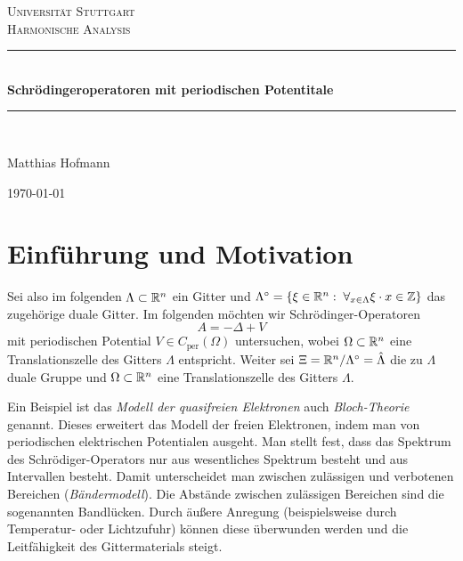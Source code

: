 \documentclass{mywork}
\begin{document}
\begin{titlepage}

\begin{center}



\textsc{\LARGE Universität Stuttgart}\\[1.5cm]

\textsc{\Large Harmonische Analysis}\\[0.5cm]


\newcommand{\HRule}{\rule{\linewidth}{0.5mm}}
\HRule \\[0.4cm]
{ \huge \bfseries Schrödingeroperatoren mit periodischen Potentitale}\\[0.4cm]

\HRule \\[1.5cm]


\begin{center} \Large
Matthias Hofmann
\end{center}

\hfill

\vfill

{\large \today}

\end{center}

\end{titlepage}
\section{Einführung und Motivation}
Sei also im folgenden $\Lambda \subset \mathbb{R}^n$ ein Gitter und $\Lambda^\circ= \{\xi \in \R^n: \forall_{x\in \Lambda} \xi \cdot x \in \Z\}$ das zugehörige duale Gitter. Im folgenden möchten wir Schrödinger-Operatoren 
$$ A=- \Delta + V$$
mit periodischen Potential $V\in C_{\text{per}}(\Omega)$ untersuchen, wobei $\Omega \subset \mathbb{R}^n$ eine Translationszelle des Gitters $\Lambda$ entspricht.   Weiter sei $\Xi= \mathbb{R}^n/ \Lambda^\circ= \hat \Lambda$ die zu $\Lambda$ duale Gruppe und $\Omega\subset \mathbb{R}^n$ eine Translationszelle des Gitters $\Lambda$.

Ein Beispiel ist das \emph{Modell der quasifreien Elektronen} auch \emph{Bloch-Theorie} genannt.  Dieses erweitert das Modell  der freien Elektronen, indem man von periodischen elektrischen Potentialen ausgeht. Man stellt fest, dass das Spektrum des Schrödiger-Operators nur aus wesentliches Spektrum besteht und aus Intervallen besteht.  Damit unterscheidet man zwischen zulässigen und verbotenen Bereichen (\emph{Bändermodell}).  Die Abstände zwischen zulässigen Bereichen sind die sogenannten Bandlücken.   Durch äußere Anregung (beispielsweise durch Temperatur- oder Lichtzufuhr) können diese überwunden werden und die Leitfähigkeit des Gittermaterials steigt.
\end{document}
